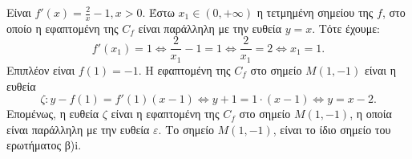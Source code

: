 \begin{alist}
\begin{figure}
    \end{figure}
    Είναι $f'(x) = \frac{2}{x} - 1, x > 0$.
    Έστω $x_1 \in (0, +\infty)$ η τετμημένη σημείου της $f$, στο οποίο η εφαπτομένη της $C_f$ είναι παράλληλη με την ευθεία $y = x$. Τότε έχουμε:
    \[
    f'(x_1) = 1 \Leftrightarrow \frac{2}{x_1} - 1 = 1 \Leftrightarrow \frac{2}{x_1} = 2 \Leftrightarrow x_1 = 1.
    \]
    Επιπλέον είναι $f(1) = -1$.
    Η εφαπτομένη της $C_f$ στο σημείο $M(1,-1)$ είναι η ευθεία
    \[
    \zeta: y - f(1) = f'(1)(x - 1) \Leftrightarrow y + 1 = 1 \cdot (x - 1) \Leftrightarrow y = x - 2.
    \]
    Επομένως, η ευθεία $\zeta$ είναι η εφαπτομένη της $C_f$ στο σημείο $M(1,-1)$, η οποία είναι παράλληλη με την ευθεία $\varepsilon$.
    Το σημείο $M(1,-1)$, είναι το ίδιο σημείο του ερωτήματος β)i.
    \monades{}
\end{alist}